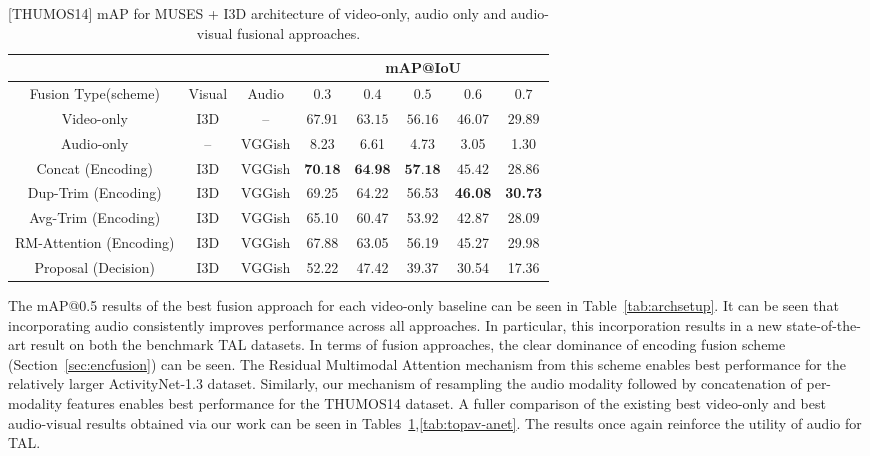 \documentclass[10pt,twocolumn,letterpaper]{article}
\begin{document}
\begin{table}[!t]
\centering
\resizebox{\linewidth}{!}
{
\centering
\begin{tabular}{c|c|c|c|c|c|c|c}
       & &  & \multicolumn{5}{c}{mAP@IoU} \\
\toprule
 Fusion Type(scheme) & Visual  & Audio & $0.3$ & $0.4$ & $\mathbf{0.5}$ & $0.6$ & $0.7$ \\
\toprule
 Video-only & I3D & -- & $67.91$ & $63.15$ & $56.16$ & $46.07$ & $29.89$ \\ 
  \midrule
Audio-only & -- & VGGish & 8.23 & 6.61 & 4.73 & 3.05 & 1.30 \\
\toprule
 Concat (Encoding) & I3D & VGGish & $\textbf{70.18}$ & $\textbf{64.98}$ & $\textbf{57.18}$ & $45.42$ & $28.86$  \\
 \midrule
 Dup-Trim (Encoding) & I3D & VGGish & 69.25 & 64.22 & 56.53 & \textbf{46.08} & \textbf{30.73} \\
  \midrule
 Avg-Trim (Encoding) & I3D & VGGish & 65.10 & 60.47 & 53.92 & 42.87 & 28.09 \\
  \midrule
 RM-Attention (Encoding) & I3D & VGGish & 67.88 & 63.05 & 56.19 & 45.27 & 29.98 \\
  \midrule
 Proposal (Decision) & I3D & VGGish & 52.22	& 47.42	& 39.37	& 30.54	& 17.36   \\

  
 \bottomrule
\end{tabular}
}
\caption{[THUMOS14] mAP for MUSES\cite{Liu_2021_CVPR} + I3D\cite{8099985} architecture of video-only, audio only and audio-visual fusional approaches.}
\label{tab:topav-thumos}
\end{table}




The mAP@0.5 results of the best fusion approach for each video-only baseline can be seen in Table~\ref{tab:archsetup}. It can be seen that incorporating audio consistently improves performance across all approaches. In particular, this incorporation results in a new state-of-the-art result on both the benchmark TAL datasets. In terms of fusion approaches, the clear dominance of encoding fusion scheme (Section~\ref{sec:encfusion}) can be seen. The Residual Multimodal Attention mechanism from this scheme enables best performance for the relatively larger ActivityNet-1.3 dataset. Similarly, our mechanism of resampling the audio modality followed by concatenation of per-modality features enables best performance for the THUMOS14 dataset. A fuller comparison of the existing best video-only and best audio-visual results obtained via our work can be seen in  Tables~\ref{tab:topav-thumos},\ref{tab:topav-anet}. The results once again reinforce the utility of audio for TAL. 
\end{document}
